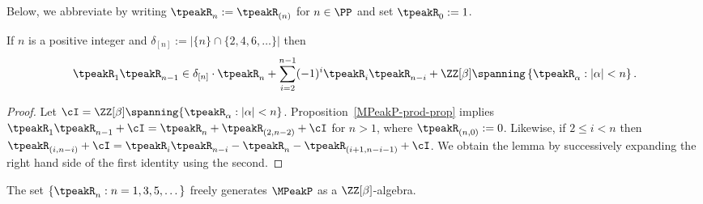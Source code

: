 Below, we abbreviate by writing $\tpeakR_{n}:=\tpeakR_{(n)}$ for $n \in \PP$ and set $\tpeakR_0 := 1$.

\begin{lemma}\label{peak-free-lem}
If $n$ is a positive integer and $\delta_{[n]} := | \{ n\} \cap \{2,4,6,\dots\}|$ then
\[ \tpeakR_1 \tpeakR_{n-1} \in \delta_{[n]}  \cdot \tpeakR_n +   \sum_{i=2}^{n-1} (-1)^i \tpeakR_i \tpeakR_{n-i}  
+  \ZZ[\beta]\spanning\left\{ \tpeakR_\alpha : |\alpha| <  n\right\}.
\]
\end{lemma}

\begin{proof}
Let $\cI =   \ZZ[\beta]\spanning \{ \tpeakR_\alpha : |\alpha| <  n \}$.
Proposition~\ref{MPeakP-prod-prop}
implies 
$\tpeakR_1 \tpeakR_{n-1}  +\cI = \tpeakR_{n} +\tpeakR_{(2,n-2)} + \cI
$
for $n>1$, where $\tpeakR_{(n,0)} := 0$.
Likewise, if $2\leq i < n$ then
$
\tpeakR_{(i, n-i)} +\cI = \tpeakR_{i}\tpeakR_{n-i}- \tpeakR_{n}-\tpeakR_{(i+1,n-i-1)} + \cI
$.
We obtain the lemma by 
successively expanding the right hand side of the first identity using the second. 
\end{proof}

\begin{proposition}\label{MPeak-free-prop}
The set $\left\{\tpeakR_n: n =1,3,5,\dots\right\}$ freely generates $\MPeakP$ as a $\ZZ[\beta]$-algebra.
\end{proposition}

